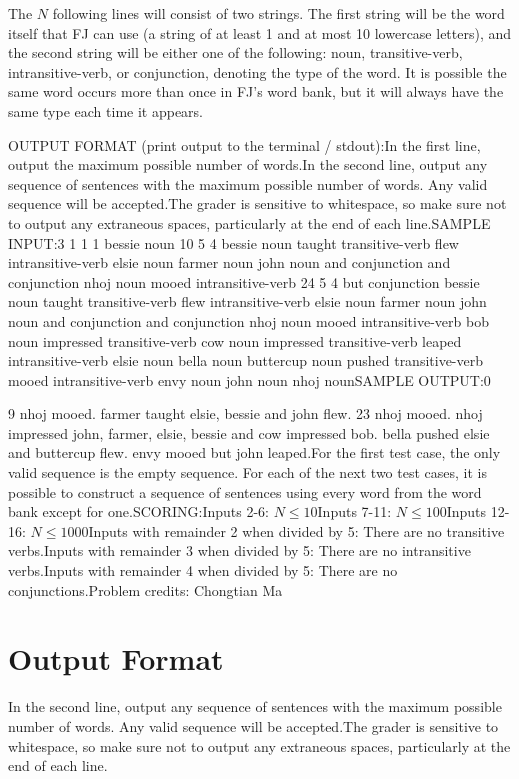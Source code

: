 \documentclass[12pt]{article}
\begin{document}
The $N$ following lines will consist of two strings. The first string will be
the word itself that FJ can use (a string of at least 1 and at most 10 lowercase
letters), and the second string will be either one of the following: noun,
transitive-verb, intransitive-verb, or conjunction, denoting the type of the
word. It is possible the same word occurs more than once in FJ's word bank, but
it will always have the same type each time it appears.

OUTPUT FORMAT (print output to the terminal / stdout):In the first line, output the maximum possible number of words.In the second line, output any sequence of sentences with the maximum possible
number of words. Any valid sequence will be accepted.The grader is sensitive to whitespace, so make sure not to output any
extraneous spaces, particularly at the end of each line.SAMPLE INPUT:3
1 1 1
bessie noun
10 5 4
bessie noun
taught transitive-verb
flew intransitive-verb
elsie noun
farmer noun
john noun
and conjunction
and conjunction
nhoj noun
mooed intransitive-verb
24 5 4
but conjunction
bessie noun
taught transitive-verb
flew intransitive-verb
elsie noun
farmer noun
john noun
and conjunction
and conjunction
nhoj noun
mooed intransitive-verb
bob noun
impressed transitive-verb
cow noun
impressed transitive-verb
leaped intransitive-verb
elsie noun
bella noun
buttercup noun
pushed transitive-verb
mooed intransitive-verb
envy noun
john noun
nhoj nounSAMPLE OUTPUT:0

9
nhoj mooed. farmer taught elsie, bessie and john flew.
23
nhoj mooed. nhoj impressed john, farmer, elsie, bessie and cow impressed bob. bella pushed elsie and buttercup flew. envy mooed but john leaped.For the first test case, the only valid sequence is the empty sequence. For each
of the next two test cases, it is possible to construct a sequence of sentences
using every word from the word bank except for one.SCORING:Inputs 2-6: $N\le 10$Inputs 7-11: $N\le 100$Inputs 12-16: $N\le 1000$Inputs with remainder 2 when divided by 5: There are no transitive
verbs.Inputs with remainder 3 when divided by 5: There are no intransitive
verbs.Inputs with remainder 4 when divided by 5: There are no conjunctions.Problem credits: Chongtian Ma

\section*{Output Format}
In the second line, output any sequence of sentences with the maximum possible
number of words. Any valid sequence will be accepted.The grader is sensitive to whitespace, so make sure not to output any
extraneous spaces, particularly at the end of each line.
\end{document}

